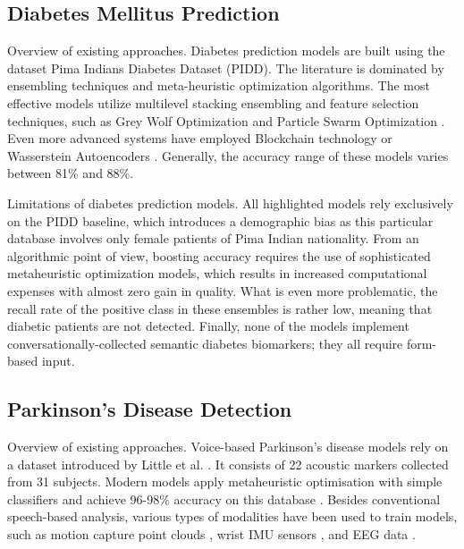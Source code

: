\subsection{Diabetes Mellitus Prediction}

Overview of existing approaches.
Diabetes prediction models are built using the dataset Pima Indians Diabetes Dataset (PIDD). The literature is dominated by ensembling techniques and meta-heuristic optimization algorithms. The most effective models utilize multilevel stacking ensembling \cite{daza2024, reza2024, elgendy2025} and feature selection techniques, such as Grey Wolf Optimization and Particle Swarm Optimization \cite{sivashankar2019, sirmayanti2024, basith2024}. Even more advanced systems have employed Blockchain technology or Wasserstein Autoencoders \cite{bhagat2024, wang2024}. Generally, the accuracy range of these models varies between 81\% and 88\%.

Limitations of diabetes prediction models.
All highlighted models rely exclusively on the PIDD baseline, which introduces a demographic bias as this particular database involves only female patients of Pima Indian nationality. From an algorithmic point of view, boosting accuracy requires the use of sophisticated metaheuristic optimization models, which results in increased computational expenses with almost zero gain in quality. What is even more problematic, the recall rate of the positive class in these ensembles is rather low, meaning that diabetic patients are not detected. Finally, none of the models implement conversationally-collected semantic diabetes biomarkers; they all require form-based input.

\subsection{Parkinson's Disease Detection}

Overview of existing approaches.
Voice-based Parkinson's disease models rely on a dataset introduced by Little et al. \cite{little2008}. It consists of 22 acoustic markers collected from 31 subjects. Modern models apply metaheuristic optimisation with simple classifiers and achieve 96-98\% accuracy on this database \cite{guatelli2024, khafaga2024, palakayala2024}. Besides conventional speech-based analysis, various types of modalities have been used to train models, such as motion capture point clouds \cite{wang2024point}, wrist IMU sensors \cite{hammouda2024}, and EEG data \cite{gao2024}.

